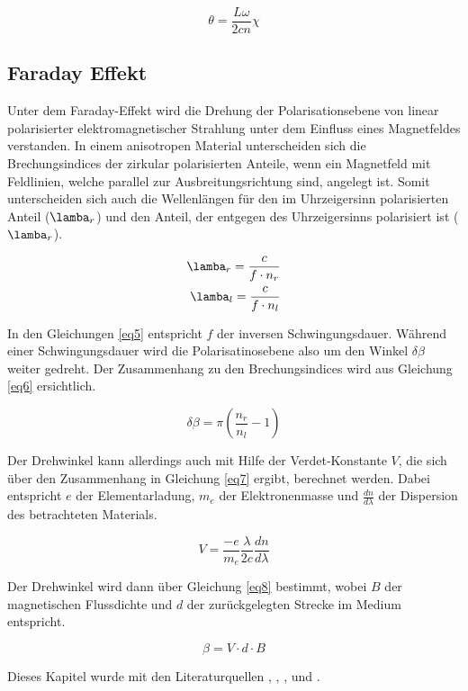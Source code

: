 \begin{equation}
    \theta = \frac{L\omega}{2cn} \chi
    \label{eq4}
\end{equation}

\subsection{Faraday Effekt}
Unter dem Faraday-Effekt wird die Drehung der Polarisationsebene von linear 
polarisierter
elektromagnetischer Strahlung unter dem Einfluss eines Magnetfeldes verstanden.
In einem anisotropen Material unterscheiden sich die Brechungsindices der 
zirkular polarisierten Anteile, wenn ein Magnetfeld mit Feldlinien, welche 
parallel zur Ausbreitungsrichtung sind, angelegt ist. Somit 
unterscheiden sich auch die Wellenlängen für den im Uhrzeigersinn polarisierten 
Anteil ($\lamba_{r}$) und den Anteil, der entgegen des Uhrzeigersinns polarisiert 
ist ($\lamba_{r}$).

\begin{align}
    \lamba_{r} = \frac{c}{f\cdot n_{r}}\\
    \lamba_{l} = \frac{c}{f\cdot n_{l}}
    \label{eq5}
\end{align}

In den Gleichungen \ref{eq5} entspricht $f$ der inversen Schwingungsdauer.
Während einer Schwingungsdauer wird die Polarisatinosebene also um den Winkel 
$\delta \beta$ weiter gedreht. Der Zusammenhang zu den Brechungsindices wird aus 
Gleichung \ref{eq6} ersichtlich.

\begin{equation}
    \delta \beta = \pi \left( \frac{n_r}{n_l} -1 \right)
    \label{eq6}
\end{equation}

Der Drehwinkel kann allerdings auch mit Hilfe der Verdet-Konstante $V$, die sich 
über den Zusammenhang in Gleichung \ref{eq7} ergibt, berechnet werden.
Dabei entspricht $e$ der Elementarladung, $m_e$ der Elektronenmasse und 
$\frac{dn}{d\lambda}$ der 
Dispersion des betrachteten Materials.

\begin{equation}
    V = \frac{-e}{m_e} \frac{\lambda}{2c} \frac{dn}{d\lambda}
    \label{eq7}
\end{equation}

Der Drehwinkel wird dann über Gleichung \ref{eq8} bestimmt, wobei 
$B$ der magnetischen Flussdichte und $d$ der zurückgelegten Strecke 
im Medium entspricht.

\begin{equation}
    \beta = V \cdot d \cdot B
    \label{eq8}
\end{equation}

Dieses Kapitel wurde mit den Literaturquellen
\cite{sample}, \cite{demt}, \cite{exp}, \cite{switch} und \cite{eng}.

